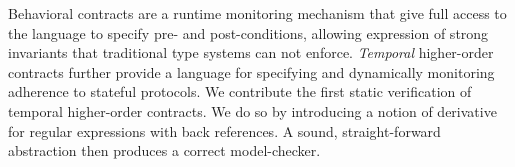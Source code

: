 Behavioral contracts are a runtime monitoring mechanism that give full access to the language to specify pre- and post-conditions, allowing expression of strong invariants that traditional type systems can not enforce.
%
\emph{Temporal} higher-order contracts further provide a language for specifying and dynamically monitoring adherence to stateful protocols.
%
We contribute the first static verification of temporal higher-order contracts.
%
We do so by introducing a notion of derivative for regular expressions with back references.
%
A sound, straight-forward abstraction then produces a correct model-checker.
